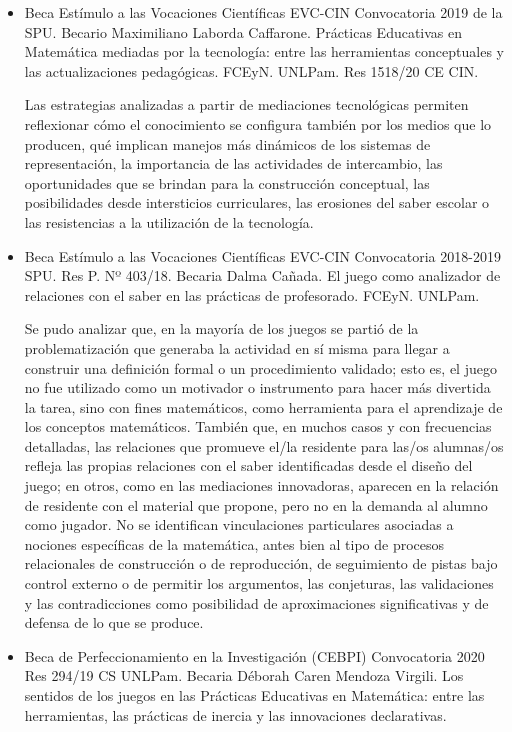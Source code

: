 \documentclass[oneside,spanish]{amsart}
\numberwithin{equation}{section}
\numberwithin{figure}{section}
\theoremstyle{definition}
\begin{document}
\begin{itemize}
	\item Beca Estímulo a las Vocaciones Científicas EVC-CIN Convocatoria 2019 de la SPU. Becario Maximiliano Laborda Caffarone. Prácticas Educativas en Matemática mediadas por la tecnología: entre las herramientas conceptuales y las actualizaciones pedagógicas. FCEyN. UNLPam. Res 1518/20 CE CIN.
	
	Las estrategias analizadas a partir de mediaciones tecnológicas permiten reflexionar cómo el conocimiento se configura también por los medios que lo producen, qué implican manejos más dinámicos de los sistemas de representación, la importancia de las actividades de intercambio, las oportunidades que se brindan para la construcción conceptual, las posibilidades desde intersticios curriculares, las erosiones del saber escolar o las resistencias a la utilización de la tecnología. 
	
	\item Beca Estímulo a las Vocaciones Científicas EVC-CIN Convocatoria 2018-2019 SPU. Res P. Nº 403/18. Becaria Dalma Cañada. El juego como analizador de relaciones con el saber en las prácticas de profesorado. FCEyN. UNLPam.
	
	Se pudo analizar que, en la mayoría de los juegos se partió de la problematización que generaba la actividad en sí misma para llegar a construir una definición formal o un procedimiento validado; esto es, el juego no fue utilizado como un motivador o instrumento para hacer más divertida la tarea, sino con fines matemáticos, como herramienta para el aprendizaje de los conceptos matemáticos. También que, en muchos casos y con frecuencias detalladas, las relaciones que promueve el/la residente para las/os alumnas/os refleja las propias relaciones con el saber identificadas desde el diseño del juego; en otros, como en las mediaciones innovadoras, aparecen en la relación de residente con el material que propone, pero no en la demanda al alumno como jugador. No se identifican vinculaciones particulares asociadas a nociones específicas de la matemática, antes bien al tipo de procesos relacionales de construcción o de reproducción, de seguimiento de pistas bajo control externo o de permitir los argumentos, las conjeturas, las validaciones y las contradicciones como posibilidad de aproximaciones significativas y de defensa de lo que se produce.
	
	\item Beca de Perfeccionamiento en la Investigación (CEBPI) Convocatoria 2020 Res 294/19 CS UNLPam. Becaria Déborah Caren Mendoza Virgili. Los sentidos de los juegos en las Prácticas Educativas en Matemática: entre las herramientas, las prácticas de inercia y las innovaciones declarativas.
	

\end{itemize}
\end{document}
